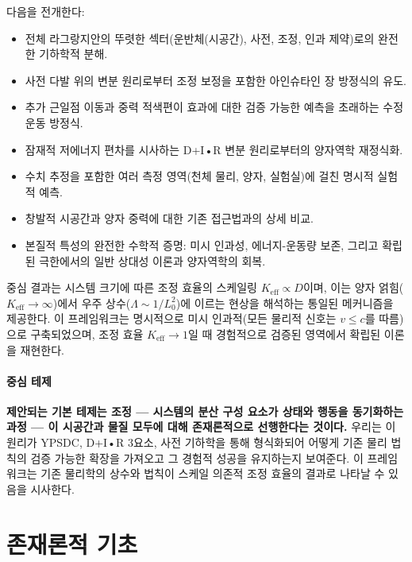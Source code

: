 \documentclass[11pt,a4paper]{article}
\begin{document}
	다음을 전개한다:
	\begin{itemize}
		\item 전체 라그랑지안의 뚜렷한 섹터(운반체(시공간), 사전, 조정, 인과 제약)로의 완전한 기하학적 분해.
		\item 사전 다발 위의 변분 원리로부터 조정 보정을 포함한 아인슈타인 장 방정식의 유도.
		\item 추가 근일점 이동과 중력 적색편이 효과에 대한 검증 가능한 예측을 초래하는 수정 운동 방정식.
		\item 잠재적 저에너지 편차를 시사하는 D+I•R 변분 원리로부터의 양자역학 재정식화.
		\item 수치 추정을 포함한 여러 측정 영역(천체 물리, 양자, 실험실)에 걸친 명시적 실험적 예측.
		\item 창발적 시공간과 양자 중력에 대한 기존 접근법과의 상세 비교.
		\item 본질적 특성의 완전한 수학적 증명: 미시 인과성, 에너지-운동량 보존, 그리고 확립된 극한에서의 일반 상대성 이론과 양자역학의 회복.
	\end{itemize}
	
	중심 결과는 시스템 크기에 따른 조정 효율의 스케일링 $K_{\mathrm{eff}} \propto D$이며, 이는 양자 얽힘($K_{\mathrm{eff}} \to \infty$)에서 우주 상수($\Lambda \sim 1/L_0^2$)에 이르는 현상을 해석하는 통일된 메커니즘을 제공한다. 이 프레임워크는 명시적으로 미시 인과적(모든 물리적 신호는 $v \leq c$를 따름)으로 구축되었으며, 조정 효율 $K_{\mathrm{eff}} \to 1$일 때 경험적으로 검증된 영역에서 확립된 이론을 재현한다.
	
	\paragraph{중심 테제}
	\textbf{제안되는 기본 테제는 조정 — 시스템의 분산 구성 요소가 상태와 행동을 동기화하는 과정 — 이 시공간과 물질 모두에 대해 존재론적으로 선행한다는 것이다.} 우리는 이 원리가 YPSDC, D+I•R 3요소, 사전 기하학을 통해 형식화되어 어떻게 기존 물리 법칙의 검증 가능한 확장을 가져오고 그 경험적 성공을 유지하는지 보여준다. 이 프레임워크는 기존 물리학의 상수와 법칙이 스케일 의존적 조정 효율의 결과로 나타날 수 있음을 시사한다.
	
	\section{존재론적 기초}
	\label{sec:ontological-foundations}
	
\end{document}

